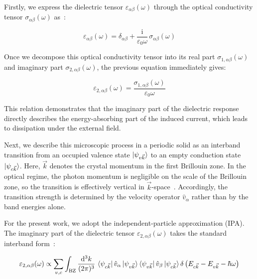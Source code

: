 Firstly, we express the dielectric tensor $\varepsilon_{\alpha\beta}(\omega)$ through the optical conductivity tensor $\sigma_{\alpha\beta}(\omega)$ as~\cite{kubo1957statistical,onida2002electronic}:

\begin{equation}
    \varepsilon_{\alpha\beta}(\omega)
    = \delta_{\alpha\beta} + \frac{\mathrm{i}}{\varepsilon_0\omega}\,
    \sigma_{\alpha\beta}(\omega)
\label{dielectric_tensor_from_optical_conductivity}
\end{equation}

Once we decompose this optical conductivity tensor into its real part $\sigma_{1,\alpha\beta}(\omega)$ and imaginary part $\sigma_{2,\alpha\beta}(\omega)$, 
the previous equation immediately gives:

\begin{equation}
    \varepsilon_{2,\alpha\beta}(\omega)
    = \frac{\sigma_{1,\alpha\beta}(\omega)}{\varepsilon_0\omega}
\label{imaginary_dielectric_from_real_conductivity}
\end{equation}

This relation demonstrates that the imaginary part of the dielectric response directly describes the energy-absorbing part of the induced current,
which leads to dissipation under the external field.

Next, we describe this microscopic process in a periodic solid as an interband transition from an occupied valence state $\ket{\psi_{v\vec{k}}}$ to an empty conduction state $\ket{\psi_{c\vec{k}}}$.
Here, $\vec{k}$ denotes the crystal momentum in the first Brillouin zone. In the optical regime,
the photon momentum is negligible on the scale of the Brillouin zone, so the transition is effectively vertical in $\vec{k}$-space~\cite{fox2010optical}. 
Accordingly, the transition strength is determined by the velocity operator $\hat{v}_\alpha$ rather than by the band energies alone.

For the present work, we adopt the independent-particle approximation (IPA).
The imaginary part of the dielectric tensor $\varepsilon_{2,\alpha\beta}(\omega)$ takes the standard interband form~\cite{d2016accurate}:

\begin{equation}
    \varepsilon_{2,\alpha\beta}(\omega)\propto
    \sum_{v,c}
    \int_{\mathrm{BZ}}\frac{\mathrm{d}^3{k}}{(2\pi)^3}\,
    \bra{\psi_{c\vec{k}}}\hat{v}_{\alpha}\ket{\psi_{v\vec{k}}}
    \bra{\psi_{v\vec{k}}}\hat{v}_{\beta}\ket{\psi_{c\vec{k}}}
    \delta\left(E_{c\vec{k}} - E_{v\vec{k}} - \hbar\omega\right)
\label{independent_particle_imaginary_dielectric_tensor}
\end{equation}

